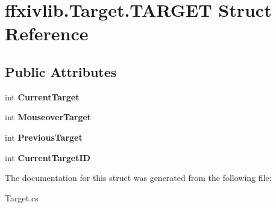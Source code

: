 \hypertarget{structffxivlib_1_1_target_1_1_t_a_r_g_e_t}{\section{ffxivlib.\-Target.\-T\-A\-R\-G\-E\-T Struct Reference}
\label{structffxivlib_1_1_target_1_1_t_a_r_g_e_t}
}
\subsection*{Public Attributes}
\begin{DoxyCompactItemize}
\item 
\hypertarget{structffxivlib_1_1_target_1_1_t_a_r_g_e_t_a09363b015f76f3fe6835f2329afa340d}{int {\bfseries Current\-Target}}\label{structffxivlib_1_1_target_1_1_t_a_r_g_e_t_a09363b015f76f3fe6835f2329afa340d}

\item 
\hypertarget{structffxivlib_1_1_target_1_1_t_a_r_g_e_t_a9ae0253a6651d33195eb2705ed72dbe7}{int {\bfseries Mouseover\-Target}}\label{structffxivlib_1_1_target_1_1_t_a_r_g_e_t_a9ae0253a6651d33195eb2705ed72dbe7}

\item 
\hypertarget{structffxivlib_1_1_target_1_1_t_a_r_g_e_t_a7efad8c4a75fbd1089826763551b63be}{int {\bfseries Previous\-Target}}\label{structffxivlib_1_1_target_1_1_t_a_r_g_e_t_a7efad8c4a75fbd1089826763551b63be}

\item 
\hypertarget{structffxivlib_1_1_target_1_1_t_a_r_g_e_t_a5966d34fa56acb18f67d364d8fb5d9d2}{int {\bfseries Current\-Target\-I\-D}}\label{structffxivlib_1_1_target_1_1_t_a_r_g_e_t_a5966d34fa56acb18f67d364d8fb5d9d2}

\end{DoxyCompactItemize}


The documentation for this struct was generated from the following file\-:\begin{DoxyCompactItemize}
\item 
Target.\-cs\end{DoxyCompactItemize}
